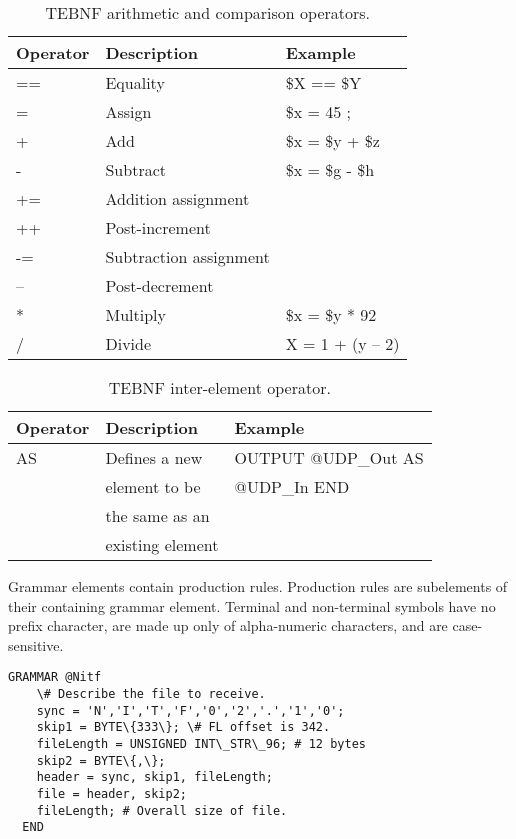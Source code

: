 \begin{table}[h]
\begin{center}
\caption{TEBNF arithmetic and comparison operators.}
\label{TEBNFArithmeticAndComparisonOperators}
\begin{tabular}{|l|l|l|} \hline
\textbf{Operator} & \textbf{Description} & \textbf{Example} \\ \hline \hline
== & Equality & \$X == \$Y \\ \hline
=  & Assign   & \$x = 45 ; \\ \hline
+  & Add      & \$x = \$y + \$z \\ \hline
-  & Subtract & \$x = \$g - \$h \\ \hline
+= & Addition assignment & 	 \\ \hline
++ & Post-increment &  \\ \hline
-= & Subtraction assignment &  \\ \hline
-- & Post-decrement &  \\ \hline
*  & Multiply & \$x = \$y * 92 \\ \hline
/  & Divide & X = 1 + (y – 2) \\ \hline
\end{tabular}
\end{center}
\end{table}

\begin{table}[h]
\begin{center}
\caption{TEBNF inter-element operator.}
\label{TEBNFInterElementOperator}
\begin{tabular}{|l|l|l|} \hline
\textbf{Operator} & \textbf{Description} & \textbf{Example} \\ \hline \hline
AS & Defines a new    & OUTPUT @UDP\_Out AS \\
   & element to be    & @UDP\_In END        \\                  
   & the same as an   &                     \\
   & existing element &                     \\ \hline
\end{tabular}
\end{center}
\end{table}

\label{sec:TEBNFGrammarElements}
Grammar elements contain production rules.  Production rules are subelements of their containing grammar element.  Terminal and non-terminal symbols have no prefix character, are made up only of alpha-numeric characters, and are case-sensitive.
\begin{lstlisting}[basicstyle=\small,caption={A TEBNF Grammar element.},label=ExampleGrammarElement]
  GRAMMAR @Nitf
    \# Describe the file to receive.
    sync = 'N','I','T','F','0','2','.','1','0';
    skip1 = BYTE\{333\}; \# FL offset is 342.
    fileLength = UNSIGNED INT\_STR\_96; # 12 bytes
    skip2 = BYTE\{,\};
    header = sync, skip1, fileLength;
    file = header, skip2;
    fileLength; # Overall size of file.
  END
\end{lstlisting}

